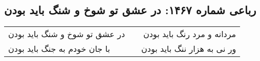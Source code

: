 \begin{center}
\section*{رباعی شماره ۱۴۶۷: در عشق تو شوخ و شنگ باید بودن}
\label{sec:1467}
\begin{longtable}{l p{0.5cm} r}
در عشق تو شوخ و شنگ باید بودن
&&
مردانه و مرد رنگ باید بودن
\\
با جان خودم به جنگ باید بودن
&&
ور نی به هزار ننگ باید بودن
\\
\end{longtable}
\end{center}
